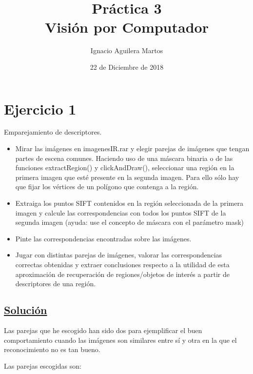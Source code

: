 \documentclass[12pt,a4paper]{article}
\author{Ignacio Aguilera Martos}
\title{Práctica 3 \\ Visión por Computador}
\date{22 de Diciembre de 2018}
\begin{document}
	\maketitle

	\tableofcontents

	\newpage



\section{Ejercicio 1}

Emparejamiento de descriptores.
\begin{itemize}
  \item Mirar las imágenes en imagenesIR.rar y elegir parejas de imágenes que tengan partes de escena comunes. Haciendo uso de una máscara binaria o de las funciones extractRegion() y clickAndDraw(), seleccionar una región en la primera imagen que esté presente en la segunda imagen. Para ello sólo hay que fijar los vértices de un polígono que contenga a la región.
  \item Extraiga los puntos SIFT contenidos en la región seleccionada de la primera imagen y calcule las correspondencias con todos los puntos SIFT de la segunda imagen (ayuda: use el concepto de máscara con el parámetro mask)
  \item Pinte las correspondencias encontradas sobre las imágenes.
  \item Jugar con distintas parejas de imágenes, valorar las correspondencias correctas obtenidas y extraer conclusiones respecto a la utilidad de esta aproximación de recuperación de regiones/objetos de interés a partir de descriptores de una región.
\end{itemize}

\subsection*{\underline{Solución}}

Las parejas que he escogido han sido dos para ejemplificar el buen comportamiento cuando las imágenes son similares entre sí y otra en la que el reconocimiento no es tan bueno.

\vspace{10px}

Las parejas escogidas son:
\end{document}
